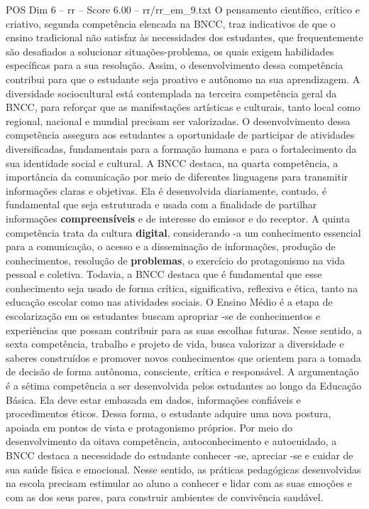 \begin{textsample}{POS Dim 6 – rr – Score 6.00 – rr/rr\_em\_9.txt}
O pensamento científico, crítico e criativo, segunda competência elencada na BNCC, traz indicativos de que o ensino tradicional não satisfaz às necessidades dos estudantes, que frequentemente são desafiados a solucionar situações-problema, os quais exigem habilidades específicas para a sua resolução.
Assim, o desenvolvimento dessa competência contribui para que o estudante seja proativo e autônomo na sua aprendizagem.
A diversidade sociocultural está contemplada na terceira competência geral da BNCC, para reforçar que as manifestações artísticas e culturais, tanto local como regional, nacional e mundial precisam ser valorizadas.
O desenvolvimento dessa competência assegura aos estudantes a oportunidade de participar de atividades diversificadas, fundamentais para a formação humana e para o fortalecimento da sua identidade social e cultural.
A BNCC destaca, na quarta competência, a importância da comunicação por meio de diferentes linguagens para transmitir informações claras e objetivas.
Ela é desenvolvida diariamente, contudo, é fundamental que seja estruturada e usada com a finalidade de partilhar informações \textbf{compreensíveis} e de interesse do emissor e do receptor.
A quinta competência trata da cultura \textbf{digital}, considerando -a um conhecimento essencial para a comunicação, o acesso e a disseminação de informações, produção de conhecimentos, resolução de \textbf{problemas}, o exercício do protagonismo na vida pessoal e coletiva.
Todavia, a BNCC destaca que é fundamental que esse conhecimento seja usado de forma crítica, significativa, reflexiva e ética, tanto na educação escolar como nas atividades sociais.
O Ensino Médio é a etapa de escolarização em os estudantes buscam apropriar -se de conhecimentos e experiências que possam contribuir para as suas escolhas futuras.
Nesse sentido, a sexta competência, trabalho e projeto de vida, busca valorizar a diversidade e saberes construídos e promover novos conhecimentos que orientem para a tomada de decisão de forma autônoma, consciente, crítica e responsável.
A argumentação é a sétima competência a ser desenvolvida pelos estudantes ao longo da Educação Básica.
Ela deve estar embasada em dados, informações confiáveis e procedimentos éticos.
Dessa forma, o estudante adquire uma nova postura, apoiada em pontos de vista e protagonismo próprios.
Por meio do desenvolvimento da oitava competência, autoconhecimento e autocuidado, a BNCC destaca a necessidade do estudante conhecer -se, apreciar -se e cuidar de sua saúde física e emocional.
Nesse sentido, as práticas pedagógicas desenvolvidas na escola precisam estimular ao aluno a conhecer e lidar com as suas emoções e com as dos seus pares, para construir ambientes de convivência saudável.

\end{textsample}
